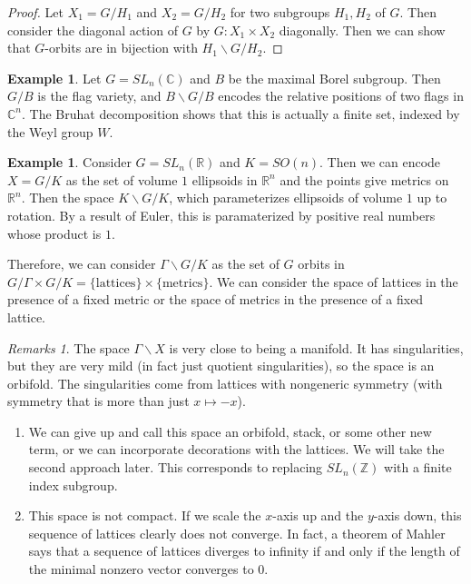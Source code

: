 \documentclass[leqno, openany]{memoir}
\theoremstyle{definition}
\newtheorem{exm}[thm]{Example}
\theoremstyle{remark}
\newtheorem{rmks}[thm]{Remarks}
\theoremstyle{plain}
\theoremstyle{definition}
\theoremstyle{remark}
\newcommand{\R}{\mathbb{R}}
\renewcommand{\C}{\mathbb{C}}
\newcommand{\Z}{\mathbb{Z}}
\begin{document}
\begin{proof}
    Let $X_1 = G/H_1$ and $X_2 = G/H_2$ for two subgroups $H_1,H_2$ of $G$. Then consider the diagonal action of $G$ by $G: X_1 \times X_2$ diagonally. Then we can show that $G$-orbits are in bijection with $H_1 \backslash G / H_2$.
\end{proof}

\begin{exm}
    Let $G = SL_n(\C)$ and $B$ be the maximal Borel subgroup. Then $G/B$ is the flag variety, and $B \backslash G / B$ encodes the relative positions of two flags in $\C^n$. The Bruhat decomposition shows that this is actually a finite set, indexed by the Weyl group $W$.
\end{exm}

\begin{exm}
    Consider $G = SL_n(\R)$ and $K = SO(n)$. Then we can encode $X = G/K$ as the set of volume $1$ ellipsoids in $\R^n$ and the points give metrics on $\R^n$. Then the space $K \backslash G / K$, which parameterizes ellipsoids of volume $1$ up to rotation. By a result of Euler, this is paramaterized by positive real numbers whose product is $1$.
\end{exm}

Therefore, we can consider $\Gamma \backslash G / K$ as the set of $G$ orbits in $G/\Gamma \times G/K = \{ \text{lattices} \} \times \{ \text{metrics} \}$. We can consider the space of lattices in the presence of a fixed metric or the space of metrics in the presence of a fixed lattice.

\begin{rmks}
    The space $\Gamma \backslash X$ is very close to being a manifold. It has singularities, but they are very mild (in fact just quotient singularities), so the space is an orbifold. The singularities come from lattices with nongeneric symmetry (with symmetry that is more than just $x \mapsto -x$).

    \begin{enumerate}
        \item We can give up and call this space an orbifold, stack, or some other new term, or we can incorporate decorations with the lattices. We will take the second approach later. This corresponds to replacing $SL_n(\Z)$ with a finite index subgroup.
        \item This space is not compact. If we scale the $x$-axis up and the $y$-axis down, this sequence of lattices clearly does not converge. In fact, a theorem of Mahler says that a sequence of lattices diverges to infinity if and only if the length of the minimal nonzero vector converges to $0$.
    \end{enumerate}
\end{rmks}
\end{document}
